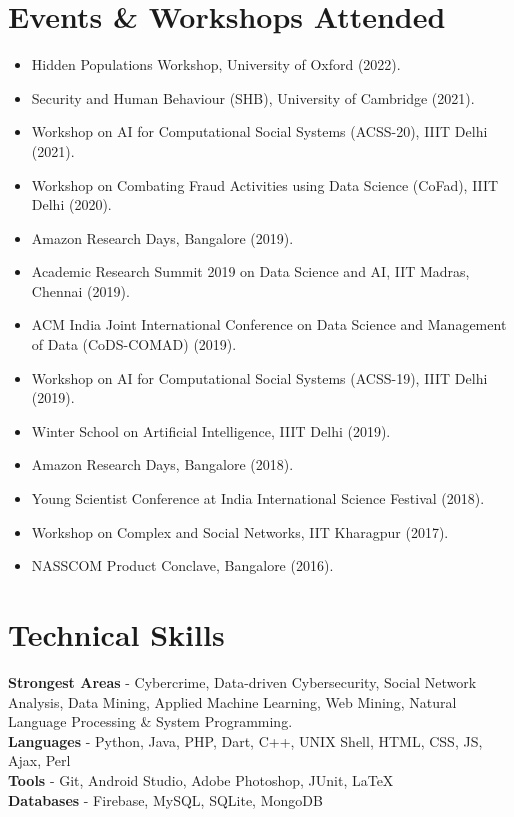 \documentclass[margin, centered,lmodern]{res}
\begin{document}
\begin{resume}
\section{Events \& Workshops Attended}
\begin{itemize}[leftmargin=*]
\item Hidden Populations Workshop, University of Oxford (2022).
\item Security and Human Behaviour (SHB), University of Cambridge (2021).
\item Workshop on AI for Computational Social Systems (ACSS-20), IIIT Delhi (2021).
\item Workshop on Combating Fraud Activities using Data Science (CoFad), IIIT Delhi (2020).
\item Amazon Research Days, Bangalore (2019).
\item Academic Research Summit 2019 on Data Science and AI, IIT Madras, Chennai (2019).
\item ACM India Joint International Conference on Data Science and Management of Data (CoDS-COMAD) (2019).
\item Workshop on AI for Computational Social Systems (ACSS-19), IIIT Delhi (2019).
\item Winter School on Artificial Intelligence,  IIIT Delhi (2019).
\item Amazon Research Days, Bangalore (2018).
\item Young Scientist Conference at India International Science Festival (2018).
\item Workshop on Complex and Social Networks, IIT Kharagpur (2017).
\item NASSCOM Product Conclave, Bangalore (2016).
\end{itemize}


\section{Technical \hspace{2mm} Skills}
\textbf{Strongest Areas} - Cybercrime, Data-driven Cybersecurity, Social Network Analysis, Data Mining, Applied Machine Learning, Web Mining, Natural Language Processing \& System Programming. \\
\textbf{Languages} - Python, Java, PHP, Dart, C++, UNIX Shell, HTML, CSS, JS, Ajax, Perl \\
\textbf{Tools} - Git, Android Studio, Adobe Photoshop, JUnit, \LaTeX \\
\textbf{Databases} - Firebase, MySQL, SQLite, MongoDB \\


\end{resume}
\end{document}
